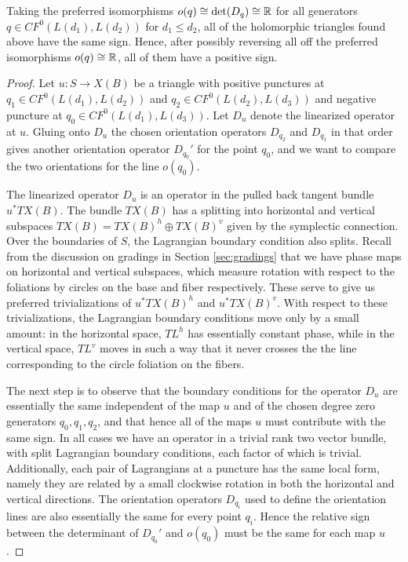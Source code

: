 \documentclass[12pt]{amsart}
\begin{document}
\begin{proposition}
  \label{prop:signs}
  Taking the preferred isomorphisms $o(q) \cong \det(D_q)\cong \mathbb{R}$ for all generators
  $q \in CF^0(L(d_1),L(d_2))$ for $d_1 \leq d_2$, all of the
  holomorphic triangles found above have the same sign. Hence, after possibly reversing all off the preferred isomorphisms $o(q) \cong \mathbb{R}$, all of them have a positive sign.
\end{proposition}
\begin{proof}
  Let $u: S \to X(B)$ be a triangle with positive punctures at $q_1
  \in CF^0(L(d_1),L(d_2))$ and $q_2 \in CF^0(L(d_2),L(d_3))$ and
  negative puncture at $q_0 \in CF^0(L(d_1),L(d_3))$. Let $D_u$ denote
  the linearized operator at $u$. Gluing onto $D_u$ the chosen
  orientation operators $D_{q_2}$ and $D_{q_1}$ in that order gives
  another orientation operator $D_{q_0}'$ for the point $q_0$, and we want to compare the two orientations for the line $o(q_0)$. 
  
  The linearized operator $D_u$ is an operator in the pulled back tangent bundle $u^*TX(B)$. The bundle $TX(B)$ has a splitting into horizontal and vertical subspaces $TX(B) = TX(B)^h \oplus TX(B)^v$ given by the symplectic connection. Over the boundaries of $S$, the Lagrangian boundary condition also splits. Recall from the discussion on gradings in Section \ref{sec:gradings} that we have phase maps on horizontal and vertical subspaces, which measure rotation with respect to the foliations by circles on the base and fiber respectively. These serve to give us preferred trivializations of $u^*TX(B)^h$ and $u^*TX(B)^v$. With respect to these trivializations, the Lagrangian boundary conditions move only by a small amount: in the horizontal space, $TL^h$ has essentially constant phase, while in the vertical space, $TL^v$ moves in such a way that it never crosses the the line corresponding to the circle foliation on the fibers. 

The next step is to observe that the boundary conditions for the operator $D_u$ are essentially the same independent of the map $u$ and of the chosen degree zero generators $q_0, q_1, q_2$, and that hence all of the maps $u$ must contribute with the same sign. In all cases we have an operator in a trivial rank two vector bundle, with split Lagrangian boundary conditions, each factor of which is trivial. Additionally, each pair of Lagrangians at a puncture has the same local form, namely they are related by a small clockwise rotation in both the horizontal and vertical directions. The orientation operators $D_{q_i}$ used to define the orientation lines are also essentially the same for every point $q_i$. Hence the relative sign between the determinant of $D_{q_0}'$ and $o(q_0)$ must be the same for each map $u$.


\end{proof}
\end{document}
